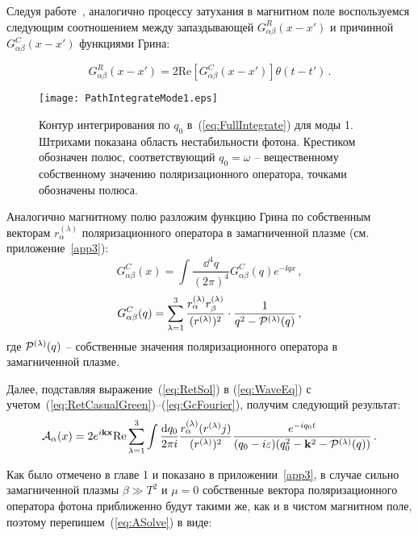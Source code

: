 Следуя работе~\cite{MikhChist:2001}, аналогично процессу затухания в магнитном поле воспользуемся следующим соотношением между запаздывающей $G^R_{\alpha\beta}(x-x')$ и причинной $G^C_{\alpha\beta}(x-x')$ функциями Грина:

\begin{equation}\label{eq:RetCasualGreen}
G^R_{\alpha\beta}(x-x')= 2 \mathrm{Re} \left[G^C_{\alpha\beta}(x-x')\right]\theta(t-t')\, .
\end{equation}

\begin{center}
	\begin{figure}[t!]\centering
		\texttt{[image: PathIntegrateMode1.eps]}
		\caption{Контур интегрирования по $q_0$ в~(\ref{eq:FullIntegrate}) для моды 1. Штрихами показана область нестабильности фотона. Крестиком обозначен полюс, соответствующий $q_0=\omega$ -- вещественному собственному значению поляризационного оператора, точками обозначены полюса.} \label{fig:FullPathIntegrMode1}
	\end{figure}
\end{center}

Аналогично магнитному полю разложим функцию Грина по собственным векторам $r_\alpha^{(\lambda)}$ поляризационного оператора в замагниченной плазме (см. приложение~\ref{app3}):
\begin{equation}\label{eq:InvGcFourier}
	G^C_{\alpha\beta}(x)=\int \frac{\dd^4q}{(2\pi)^4}G^C_{\alpha \beta}(q) e^{-\ii qx}\, ,
\end{equation}
\begin{equation}\label{eq:GcFourier}
	G^C_{\alpha\beta}(q)=\sum_{\lambda=1}^{3}\frac{r_\alpha^{(\lambda)}r^{(\lambda)}_\beta}{(r^{(\lambda)})^2}\cdot \frac{1}{q^2-{\cal P}^{(\lambda)}(q)}\, ,
\end{equation}
где ${\cal P}^{(\lambda)}(q)$ -- собственные значения поляризационного оператора в замагниченной плазме.

Далее, подставляя выражение~(\ref{eq:RetSol}) в (\ref{eq:WaveEq}) с учетом~(\ref{eq:RetCasualGreen})--(\ref{eq:GcFourier}), получим следующий результат:
\begin{equation}\label{eq:ASolvePlasma}
	{\cal A}_\alpha(x) = 2 e^{i \mathbf{kx}} \mathrm{Re} \sum_{\lambda=1}^3 \int\frac{\mathrm{d} q_0}{2\pi i}\frac{r_\alpha^{(\lambda)}(r^{(\lambda)} j)}{(r^{(\lambda)})^2}\frac{e^{-i q_0 t}}{(q_0-i\varepsilon)(q_0^2-\mathbf{k}^2-{\cal P}^{(\lambda)}(q))}\, .
\end{equation}

Как было отмечено в главе 1 и показано в приложении~\ref{app3}, в случае сильно замагниченной плазмы $\beta\gg T^2$ и $\mu=0$ собственные вектора поляризационного оператора фотона приближенно будут такими же, как и в чистом магнитном поле, поэтому перепишем~(\ref{eq:ASolve}) в виде:

